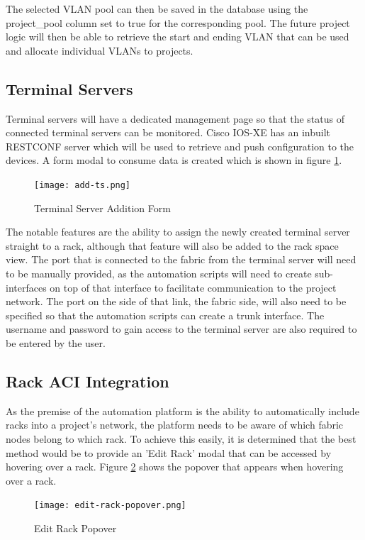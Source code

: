 The selected VLAN pool can then be saved in the database using the project\_pool column set to true for the corresponding pool. The future project logic will then be able to retrieve the start and ending VLAN that can be used and allocate individual VLANs to projects.

\subsection{Terminal Servers}
Terminal servers will have a dedicated management page so that the status of connected terminal servers can be monitored. Cisco IOS-XE has an inbuilt RESTCONF server which will be used to retrieve and push configuration to the devices. A form modal to consume data is created which is shown in figure \ref{fig:terminal-server-form}.

\begin{figure}[H]
    \centering
    \texttt{[image: add-ts.png]}
    \caption{Terminal Server Addition Form}
    \label{fig:terminal-server-form}
\end{figure}

The notable features are the ability to assign the newly created terminal server straight to a rack, although that feature will also be added to the rack space view.
The port that is connected to the fabric from the terminal server will need to be manually provided, as the automation scripts will need to create sub-interfaces on top of that interface to facilitate communication to the project network.
The port on the side of that link, the fabric side, will also need to be specified so that the automation scripts can create a trunk interface. The username and password to gain access to the terminal server are also required to be entered by the user.

\subsection{Rack ACI Integration}
As the premise of the automation platform is the ability to automatically include racks into a project's network, the platform needs to be aware of which fabric nodes belong to which rack. To achieve this easily, it is determined that the best method would be to provide an 'Edit Rack' modal that can be accessed by hovering over a rack. Figure \ref{fig:edit-rack-popover} shows the popover that appears when hovering over a rack.

\begin{figure}[H]
    \centering
    \texttt{[image: edit-rack-popover.png]}
    \caption{Edit Rack Popover}
    \label{fig:edit-rack-popover}
\end{figure}

